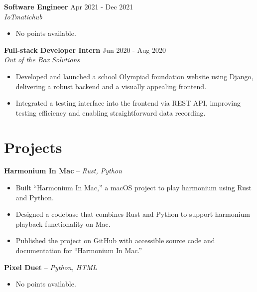 \documentclass[a4paper,10pt]{article}
\begin{document}
\vspace{-6pt}
\textbf{Software Engineer} \hfill Apr 2021 - Dec 2021 \\
\textit{IoTmatichub}
\begin{itemize}
\item No points available.
\end{itemize}
\vspace{-6pt}
\textbf{Full-stack Developer Intern} \hfill Jun 2020 - Aug 2020 \\
\textit{Out of the Box Solutions}
\begin{itemize}
\item Developed and launched a school Olympiad foundation website using Django, delivering a robust backend and a visually appealing frontend.
\item Integrated a testing interface into the frontend via REST API, improving testing efficiency and enabling straightforward data recording.
\end{itemize}


\vspace{-8pt}
\section*{Projects}
\vspace{-3pt}
\textbf{Harmonium In Mac} -- \textit{Rust, Python}
\begin{itemize}
    \item Built “Harmonium In Mac,” a macOS project to play harmonium using Rust and Python.
\item Designed a codebase that combines Rust and Python to support harmonium playback functionality on Mac.
\item Published the project on GitHub with accessible source code and documentation for “Harmonium In Mac.”
\end{itemize}
\vspace{0pt}
\textbf{Pixel Duet} -- \textit{Python, HTML}
\begin{itemize}
    \item No points available.
\end{itemize}


\vspace{-8pt}
\end{document}
